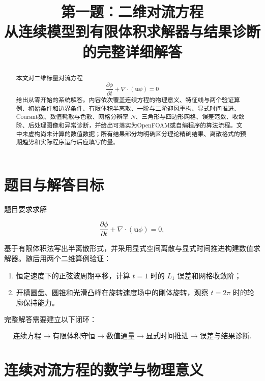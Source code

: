 \documentclass[UTF8,12pt,a4paper,fontset=fandol]{ctexart}
\title{\bfseries 第一题：二维对流方程\\从连续模型到有限体积求解器与结果诊断的完整详细解答}
\author{}
\date{}
\numberwithin{equation}{section}
\begin{document}
\maketitle
\vspace{-2.2em}

\begin{abstract}
本文对二维标量对流方程
\[
  \frac{\partial\phi}{\partial t}+\nabla\cdot(\bm u\phi)=0
\]
给出从零开始的系统解答。内容依次覆盖连续方程的物理意义、特征线与两个验证算例、初始条件和边界条件、有限体积半离散、一阶与二阶迎风重构、显式时间推进、Courant数、数值耗散与色散、网格分辨率 $N$、三角形与四边形网格、误差范数、收敛阶、后处理图像和异常诊断，并给出可落实为OpenFOAM或自编程序的算法流程。文中未虚构尚未计算的数值数据；所有结果部分均明确区分理论精确结果、离散格式的预期趋势和实际程序运行后应填写的量。
\end{abstract}

\tableofcontents
\newpage

\section{题目与解答目标}

题目要求求解

\begin{equation}
  \frac{\partial\phi}{\partial t}
  +\nabla\cdot(\bm u\phi)=0,
  \label{eq:governing}
\end{equation}

基于有限体积法写出半离散形式，并采用显式空间离散与显式时间推进构建数值求解器。随后用两个二维算例验证：

\begin{enumerate}
  \item 恒定速度下的正弦波周期平移，计算 $t=1$ 时的 $L_1$ 误差和网格收敛阶；
  \item 开槽圆盘、圆锥和光滑凸峰在旋转速度场中的刚体旋转，观察 $t=2\pi$ 时的轮廓保持能力。
\end{enumerate}

完整解答需要建立以下闭环：

\begin{equation}
\boxed{
\text{连续方程}
\rightarrow
\text{有限体积守恒}
\rightarrow
\text{数值通量}
\rightarrow
\text{显式时间推进}
\rightarrow
\text{误差与结果诊断}
}.
\end{equation}

\section{连续对流方程的数学与物理意义}
\end{document}
